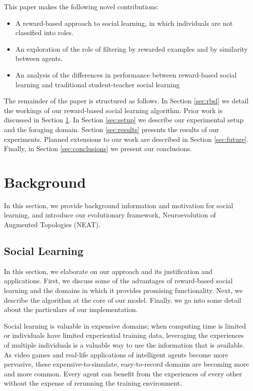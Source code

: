 \documentclass{acm_proc_article-sp}
\begin{document}
This paper makes the following novel contributions:
 
\begin{itemize}
\item A reward-based approach to social learning, in which individuals are not classified into roles.
\item An exploration of the role of filtering by rewarded examples and by similarity between agents.
\item An analysis of the differences in performance between reward-based social learning and traditional student-teacher social learning
\end{itemize}
 
The remainder of the paper is structured as follows.
In Section \ref{sec:rbsl} we detail the workings of our reward-based social learning algorithm.
Prior work is discussed in Section \ref{sec:background}.
In Section \ref{sec:setup} we describe our experimental setup and the foraging domain.
Section \ref{sec:results} presents the results of our experiments.
Planned extensions to our work are described in Section \ref{sec:future}. Finally, in Section \ref{sec:conclusions} we present our conclusions.

\section{Background}
\label{sec:background}
In this section, we provide background information and motivation for social learning, and introduce our evolutionary framework, Neuroevolution of Augmented Topologies (NEAT).

\subsection*{Social Learning}

In this section, we elaborate on our approach and its justification and applications. First, we discuss some of the advantages of reward-based social learning and the domains in which it provides promising functionality. Next, we describe the algorithm at the core of our model. Finally, we go into some detail about the particulars of our implementation.

Social learning is valuable in expensive domains; when computing time is limited or individuals have limited experiential training data, leveraging the experiences of multiple individuals is a valuable way to use the information that is available. As video games and real-life applications of intelligent agents become more pervasive, these expensive-to-simulate, easy-to-record domains are becoming more and more common. Every agent can benefit from the experiences of every other without the expense of rerunning the training environment.
\end{document}
